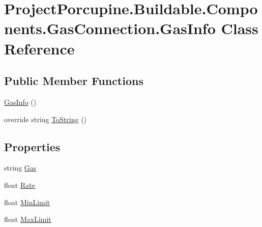 \hypertarget{class_project_porcupine_1_1_buildable_1_1_components_1_1_gas_connection_1_1_gas_info}{}\section{Project\+Porcupine.\+Buildable.\+Components.\+Gas\+Connection.\+Gas\+Info Class Reference}
\label{class_project_porcupine_1_1_buildable_1_1_components_1_1_gas_connection_1_1_gas_info}
\subsection*{Public Member Functions}
\begin{DoxyCompactItemize}
\item 
\hyperlink{class_project_porcupine_1_1_buildable_1_1_components_1_1_gas_connection_1_1_gas_info_a815d261c906c7b875cfdec9dc9f619ce}{Gas\+Info} ()
\item 
override string \hyperlink{class_project_porcupine_1_1_buildable_1_1_components_1_1_gas_connection_1_1_gas_info_a31a176a5d35bed0d68fd8d3f05b2aa6b}{To\+String} ()
\end{DoxyCompactItemize}
\subsection*{Properties}
\begin{DoxyCompactItemize}
\item 
string \hyperlink{class_project_porcupine_1_1_buildable_1_1_components_1_1_gas_connection_1_1_gas_info_a7e0a9224d2555c7ee3942bef2508c8c8}{Gas}
\item 
float \hyperlink{class_project_porcupine_1_1_buildable_1_1_components_1_1_gas_connection_1_1_gas_info_aa169bddd285ba91fcce2da6856683daa}{Rate}
\item 
float \hyperlink{class_project_porcupine_1_1_buildable_1_1_components_1_1_gas_connection_1_1_gas_info_a34b655bdbb95ba205e95e011d82482fc}{Min\+Limit}
\item 
float \hyperlink{class_project_porcupine_1_1_buildable_1_1_components_1_1_gas_connection_1_1_gas_info_a248803536fe32c60db5e7ec2f26edb51}{Max\+Limit}
\end{DoxyCompactItemize}


